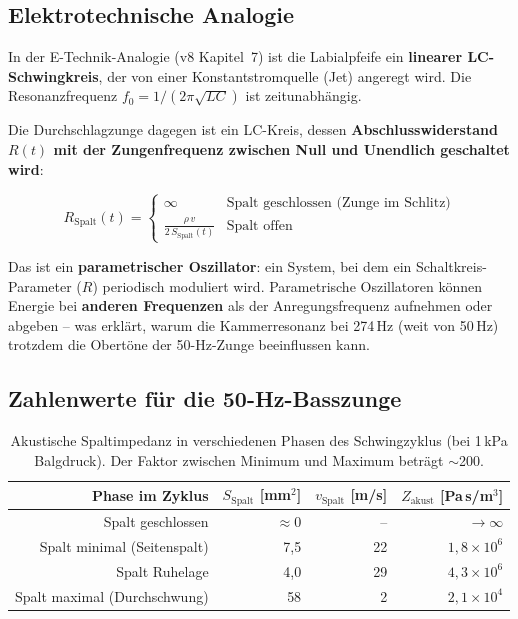 \documentclass[11pt,a4paper]{article}
\begin{document}
\subsection{Elektrotechnische Analogie}

In der E-Technik-Analogie (v8 Kapitel~7) ist die Labialpfeife ein \textbf{linearer LC-Schwingkreis}, der von einer Konstantstromquelle (Jet) angeregt wird. Die Resonanzfrequenz $f_0 = 1/(2\pi\sqrt{LC})$ ist zeitunabhängig.

Die Durchschlagzunge dagegen ist ein LC-Kreis, dessen \textbf{Abschlusswiderstand $R(t)$ mit der Zungenfrequenz zwischen Null und Unendlich geschaltet wird}:

\begin{equation}
R_\text{Spalt}(t) = \begin{cases}
\infty & \text{Spalt geschlossen (Zunge im Schlitz)} \\
\displaystyle\frac{\rho\, v}{2\, S_\text{Spalt}(t)} & \text{Spalt offen}
\end{cases}
\end{equation}

Das ist ein \textbf{parametrischer Oszillator}: ein System, bei dem ein Schaltkreis-Parameter ($R$) periodisch moduliert wird. Parametrische Oszillatoren können Energie bei \textbf{anderen Frequenzen} als der Anregungsfrequenz aufnehmen oder abgeben -- was erklärt, warum die Kammerresonanz bei 274\,Hz (weit von 50\,Hz) trotzdem die Obertöne der 50-Hz-Zunge beeinflussen kann.

\subsection{Zahlenwerte für die 50-Hz-Basszunge}

\begin{table}[H]
\centering\small
\begin{tabular}{r r r r}
\toprule
\textbf{Phase im Zyklus} & $S_\text{Spalt}$ [mm$^2$] & $v_\text{Spalt}$ [m/s] & $Z_\text{akust}$ [Pa\,s/m$^3$] \\
\midrule
Spalt geschlossen & $\approx 0$ & -- & $\to \infty$ \\
Spalt minimal (Seitenspalt) & 7{,}5 & 22 & $1{,}8 \times 10^6$ \\
Spalt Ruhelage & 4{,}0 & 29 & $4{,}3 \times 10^6$ \\
Spalt maximal (Durchschwung) & 58 & 2 & $2{,}1 \times 10^4$ \\
\bottomrule
\end{tabular}
\caption{Akustische Spaltimpedanz in verschiedenen Phasen des Schwingzyklus (bei 1\,kPa Balgdruck). Der Faktor zwischen Minimum und Maximum beträgt $\sim$200.}
\end{table}
\end{document}
